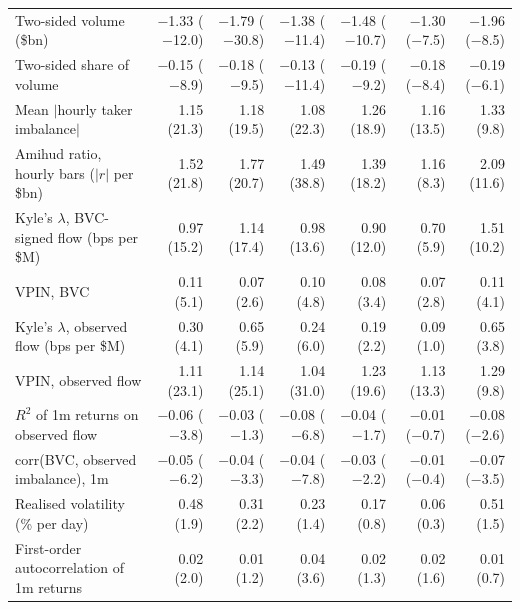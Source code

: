 \begin{tabular}{lrrrrrr}
Two-sided volume (\$bn) & \ensuremath{-}1.33 (\ensuremath{-}12.0) & \ensuremath{-}1.79 (\ensuremath{-}30.8) & \ensuremath{-}1.38 (\ensuremath{-}11.4) & \ensuremath{-}1.48 (\ensuremath{-}10.7) & \ensuremath{-}1.30 (\ensuremath{-}7.5) & \ensuremath{-}1.96 (\ensuremath{-}8.5)\\
Two-sided share of volume & \ensuremath{-}0.15 (\ensuremath{-}8.9) & \ensuremath{-}0.18 (\ensuremath{-}9.5) & \ensuremath{-}0.13 (\ensuremath{-}11.4) & \ensuremath{-}0.19 (\ensuremath{-}9.2) & \ensuremath{-}0.18 (\ensuremath{-}8.4) & \ensuremath{-}0.19 (\ensuremath{-}6.1)\\
Mean $|$hourly taker imbalance$|$ & 1.15 (21.3) & 1.18 (19.5) & 1.08 (22.3) & 1.26 (18.9) & 1.16 (13.5) & 1.33 (9.8)\\
Amihud ratio, hourly bars ($|r|$ per \$bn) & 1.52 (21.8) & 1.77 (20.7) & 1.49 (38.8) & 1.39 (18.2) & 1.16 (8.3) & 2.09 (11.6)\\
Kyle's $\lambda$, BVC-signed flow (bps per \$M) & 0.97 (15.2) & 1.14 (17.4) & 0.98 (13.6) & 0.90 (12.0) & 0.70 (5.9) & 1.51 (10.2)\\
VPIN, BVC & 0.11 (5.1) & 0.07 (2.6) & 0.10 (4.8) & 0.08 (3.4) & 0.07 (2.8) & 0.11 (4.1)\\
Kyle's $\lambda$, observed flow (bps per \$M) & 0.30 (4.1) & 0.65 (5.9) & 0.24 (6.0) & 0.19 (2.2) & 0.09 (1.0) & 0.65 (3.8)\\
VPIN, observed flow & 1.11 (23.1) & 1.14 (25.1) & 1.04 (31.0) & 1.23 (19.6) & 1.13 (13.3) & 1.29 (9.8)\\
$R^2$ of 1m returns on observed flow & \ensuremath{-}0.06 (\ensuremath{-}3.8) & \ensuremath{-}0.03 (\ensuremath{-}1.3) & \ensuremath{-}0.08 (\ensuremath{-}6.8) & \ensuremath{-}0.04 (\ensuremath{-}1.7) & \ensuremath{-}0.01 (\ensuremath{-}0.7) & \ensuremath{-}0.08 (\ensuremath{-}2.6)\\
corr(BVC, observed imbalance), 1m & \ensuremath{-}0.05 (\ensuremath{-}6.2) & \ensuremath{-}0.04 (\ensuremath{-}3.3) & \ensuremath{-}0.04 (\ensuremath{-}7.8) & \ensuremath{-}0.03 (\ensuremath{-}2.2) & \ensuremath{-}0.01 (\ensuremath{-}0.4) & \ensuremath{-}0.07 (\ensuremath{-}3.5)\\
Realised volatility (\% per day) & 0.48 (1.9) & 0.31 (2.2) & 0.23 (1.4) & 0.17 (0.8) & 0.06 (0.3) & 0.51 (1.5)\\
First-order autocorrelation of 1m returns & 0.02 (2.0) & 0.01 (1.2) & 0.04 (3.6) & 0.02 (1.3) & 0.02 (1.6) & 0.01 (0.7)\\
\bottomrule
\end{tabular}
